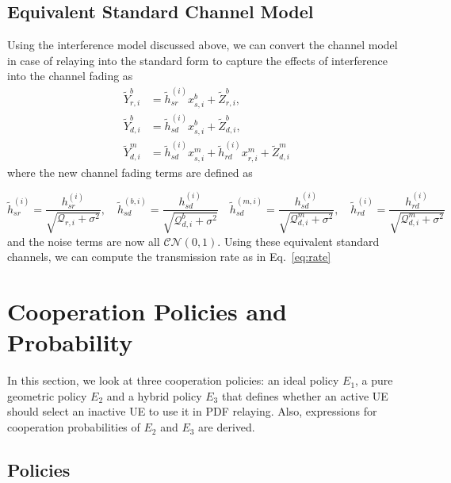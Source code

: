 \documentclass[titlepage]{article}
\begin{document}
\subsection{Equivalent Standard Channel Model}
Using the interference model discussed above, we can convert the channel model in case of relaying into the standard form to capture the effects of
interference into the channel fading as
\begin{align*}
\tilde{Y}_{r,i}^b &= \tilde{h}_{sr}^{(i)}x_{s,i}^b + \tilde{Z}_{r,i}^b, \\
\tilde{Y}_{d,i}^b &= \tilde{h}_{sd}^{(i)}x_{s,i}^b + \tilde{Z}_{d,i}^b, \\
\tilde{Y}_{d,i}^m &= \tilde{h}_{sd}^{(i)}x_{s,i}^m + \tilde{h}_{rd}^{(i)}x_{r,i}^m + \tilde{Z}_{d,i}^m
\end{align*}
where the new channel fading terms are defined as

\begin{equation*}
\tilde{h}_{sr}^{(i)} = \frac{h_{sr}^{(i)}}{\sqrt{\mathcal{Q}_{r,i} + \sigma^2}}, \quad \tilde{h}_{sd}^{(b,i)} = \frac{h_{sd}^{(i)}}{\sqrt{\mathcal{Q}_{d,i}^b + \sigma^2}} \quad
\tilde{h}_{sd}^{(m,i)} = \frac{h_{sd}^{(i)}}{\sqrt{\mathcal{Q}_{d,i}^m + \sigma^2}},
\quad \tilde{h}_{rd}^{(i)} = \frac{h_{rd}^{(i)}}{\sqrt{\mathcal{Q}_{d,i}^m + \sigma^2}}
\end{equation*}
and the noise terms are now all $\mathcal{CN}(0,1)$. Using these equivalent 
standard channels, we can compute the transmission rate as in Eq.~\ref{eq:rate}

\section{Cooperation Policies and Probability} \label{sec:coop}
In this section, we look at three cooperation policies: an ideal policy $E_1$, a 
pure geometric policy $E_2$ and a hybrid policy $E_3$ that defines whether an active UE should select an inactive UE to use it in PDF relaying. Also, expressions for cooperation probabilities of $E_2$ and $E_3$ are derived.
\subsection{Policies}
\end{document}
